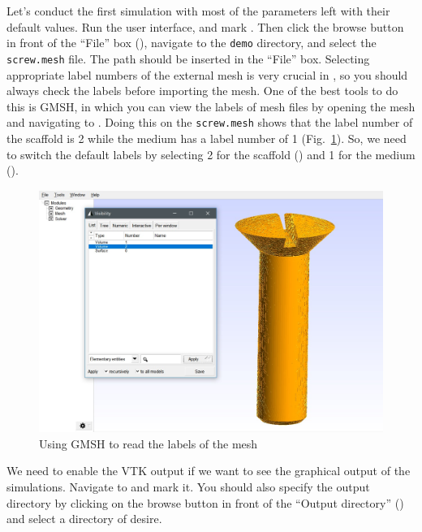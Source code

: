Let's conduct the first simulation with most of the parameters left with their default values. Run the user interface, and mark . Then click the browse button in front of the ``File'' box (), navigate to the \verb|demo| directory, and select the \verb|screw.mesh| file. The path should be inserted in the ``File'' box. Selecting appropriate label numbers of the external mesh is very crucial in \biodeg{}, so you should always check the labels before importing the mesh. One of the best tools to do this is GMSH, in which you can view the labels of mesh files by opening the mesh and navigating to . Doing this on the \verb|screw.mesh| shows that the label number of the scaffold is 2 while the medium has a label number of 1 (Fig.~\ref{fig:gmsh_label}). So, we need to switch the default labels by selecting 2 for the scaffold () and 1 for the medium ().

\begin{figure}[h]
\center \includegraphics[width=15cm]{gmsh_label}
\caption{Using GMSH to read the labels of the mesh} \label{fig:gmsh_label}
\end{figure}

We need to enable the VTK output if we want to see the graphical output of the simulations. Navigate to  and mark it. You should also specify the output directory by clicking on the browse button in front of the ``Output directory'' () and select a directory of desire. 

